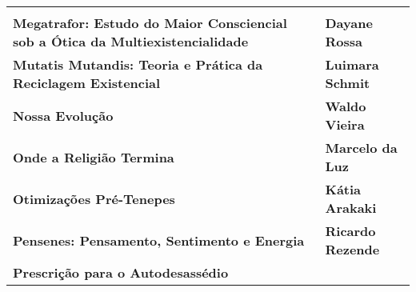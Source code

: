 \documentclass[
]{article}
\begin{document}
\begin{longtable}[]{@{}
  >{\raggedright\arraybackslash}p{}
  >{\raggedright\arraybackslash}p{}@{}}
\begin{minipage}[b]{\linewidth}
\end{minipage} \\
\begin{minipage}[b]{\linewidth}\raggedright
\textbf{Megatrafor: Estudo do Maior Consciencial sob a Ótica da Multiexistencialidade}
\end{minipage} & \begin{minipage}[b]{\linewidth}\raggedright
\textbf{Dayane Rossa}
\end{minipage} \\
\begin{minipage}[b]{\linewidth}\raggedright
\textbf{Mutatis Mutandis: Teoria e Prática da Reciclagem Existencial}
\end{minipage} & \begin{minipage}[b]{\linewidth}\raggedright
\textbf{Luimara Schmit}
\end{minipage} \\
\begin{minipage}[b]{\linewidth}\raggedright
\textbf{Nossa Evolução}
\end{minipage} & \begin{minipage}[b]{\linewidth}\raggedright
\textbf{Waldo Vieira}
\end{minipage} \\
\begin{minipage}[b]{\linewidth}\raggedright
\textbf{Onde a Religião Termina}
\end{minipage} & \begin{minipage}[b]{\linewidth}\raggedright
\textbf{Marcelo da Luz}
\end{minipage} \\
\begin{minipage}[b]{\linewidth}\raggedright
\textbf{Otimizações Pré-Tenepes}
\end{minipage} & \begin{minipage}[b]{\linewidth}\raggedright
\textbf{Kátia Arakaki}
\end{minipage} \\
\begin{minipage}[b]{\linewidth}\raggedright
\textbf{Pensenes: Pensamento, Sentimento e Energia}
\end{minipage} & \begin{minipage}[b]{\linewidth}\raggedright
\textbf{Ricardo Rezende}
\end{minipage} \\
\begin{minipage}[b]{\linewidth}\raggedright
\textbf{Prescrição para o Autodesassédio}

\end{minipage}
\end{longtable}
\end{document}
